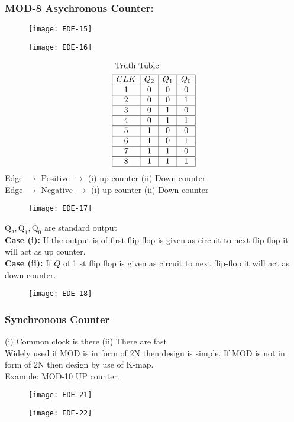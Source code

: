 \begin{enumerate}
 \subsubsection{ MOD-8 Asychronous Counter: }
 	\begin{figure}[H]
 		\centering
 		\texttt{[image: EDE-15]}
 	\end{figure}
 \begin{figure}[H]
 	\centering
 	\texttt{[image: EDE-16]}
 \end{figure}
\begin{align*}
	&\text { Truth Tuble }\\
	&\begin{array}{|c|c|c|c|}
		\hline C L K & Q_{2} & Q_{1} & Q_{0} \\
		\hline 1 & 0 & 0 & 0 \\
		\hline 2 & 0 & 0 & 1 \\
		\hline 3 & 0 & 1 & 0 \\
		\hline 4 & 0 & 1 & 1 \\
		\hline 5 & 1 & 0 & 0 \\
		\hline 6 & 1 & 0 & 1 \\
		\hline 7 & 1 & 1 & 0 \\
		\hline 8 & 1 & 1 & 1 \\
		\hline
	\end{array}
\end{align*}
 	Edge $\rightarrow$ Positive $\rightarrow$ (i) up counter (ii) Down counter \\
 	Edge $\rightarrow$ Negative $\rightarrow$ (i) up counter (ii) Down counter
 	\begin{figure}[H]
 		\centering
 		\texttt{[image: EDE-17]}
 	\end{figure}
 	$\mathrm{Q}_{2}, \mathrm{Q}_{1}, \mathrm{Q}_{0}$ are standard output\\
 	\textbf{Case (i):} If the output is of first flip-flop is given as circuit to next flip-flop it will act as up counter.\\
 	\textbf{Case (ii):} If $\bar{Q}$ of 1 st flip flop is given as circuit to next flip-flop it will act as down counter.
 	\begin{figure}[H]
 	\centering
 	\texttt{[image: 	EDE-18]}
 \end{figure}
\subsubsection{Synchronous Counter}
(i) Common clock is there (ii) There are fast \\
Widely used if MOD is in form of 2N then design is simple. If MOD is not in form of 2N then design by use of K-map.\\
	Example: MOD-10 UP counter.
	\begin{figure}[H]
		\centering
		\texttt{[image: EDE-21]}
	\end{figure}
\begin{figure}[H]
	\centering
	\texttt{[image: EDE-22]}
\end{figure}

\end{enumerate}
